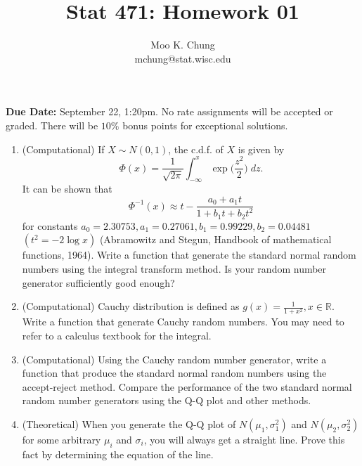\documentclass[12pt]{article} %
\begin{document}
\title{Stat 471: Homework 01}
\author{Moo K. Chung\\
mchung@stat.wisc.edu}
\maketitle \thispagestyle{empty}

{\bf Due Date:} September 22, 1:20pm. No rate assignments will be
accepted or graded. There will be $10\%$ bonus points for
exceptional solutions.

\begin{enumerate}

\item (Computational) If $X \sim N(0,1)$, the c.d.f. of $X$ is
given by
$$\Phi(x) = \frac{1}{\sqrt{2\pi}} \int_{-\infty}^x
\exp \Big(\frac{z^2}{2}\Big) \;dz.$$ It can be shown that
$$\Phi^{-1}(x) \approx t - \frac{a_0 + a_1 t}{1 + b_1 t + b_2
t^2}$$ for constants $a_0 = 2.30753, a_1=0.27061, b_1=0.99229,
b_2=0.04481$ $(t^2= -2 \log x)$ (Abramowitz and Stegun, Handbook
of mathematical functions, 1964). Write a function that generate
the
standard normal random numbers using the integral transform
method. Is your random number generator sufficiently good enough?

\item (Computational) Cauchy distribution is defined as $g(x)=
\frac{1}{1+x^2}, x \in \mathbb{R}$. Write a function that generate
Cauchy random numbers. You may need to refer to a calculus
textbook for the integral.

\item (Computational) Using the Cauchy random number generator,
write a function that produce the standard normal random numbers
using the accept-reject method. Compare the performance of the two
standard normal random number generators using the Q-Q plot and
other methods.

 \item (Theoretical) When you generate the Q-Q plot of
$N(\mu_1,\sigma_1^2)$ and $N(\mu_2,\sigma_2^2)$ for some arbitrary
$\mu_i$ and $\sigma_i$, you will always get a straight line. Prove
this fact by determining the equation of the line.
\end{enumerate}
\end{document}
